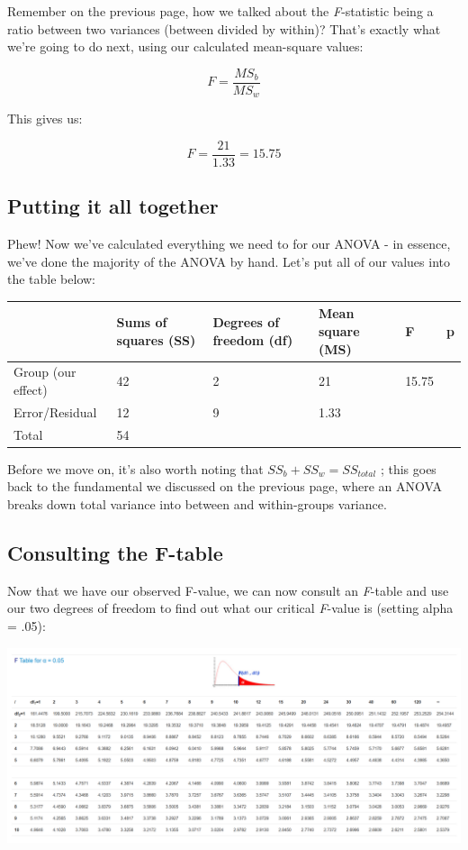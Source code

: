 \documentclass[
]{book}
\begin{document}
Remember on the previous page, how we talked about the \emph{F}-statistic being
a ratio between two variances (between divided by within)? That's
exactly what we're going to do next, using our calculated mean-square
values:

\[
F = \frac{MS_b}{MS_w}
\]

This gives us:

\[
F = \frac{21}{1.33} = 15.75
\]

\subsection{Putting it all together}\label{putting-it-all-together}

Phew! Now we've calculated everything we need to for our ANOVA - in
essence, we've done the majority of the ANOVA by hand. Let's put all of
our values into the table below:

\begin{tabular}{l|l|l|l|l|l}
\hline
 & Sums of squares (SS) & Degrees of freedom (df) & Mean square (MS) & F & p\\
\hline
Group (our effect) & 42 & 2 & 21 & 15.75 & \\
\hline
Error/Residual & 12 & 9 & 1.33 &  & \\
\hline
Total & 54 &  &  &  & \\
\hline
\end{tabular}

Before we move on, it's also worth noting that
\(SS_b + SS_w = SS_{total}\) ; this goes back to the fundamental we
discussed on the previous page, where an ANOVA breaks down total
variance into between and within-groups variance.

\subsection{Consulting the F-table}\label{consulting-the-f-table}

Now that we have our observed F-value, we can now consult an \emph{F}-table and
use our two degrees of freedom to find out what our critical \emph{F}-value is
(setting alpha = .05):

\includegraphics{img/w9_f-table.png}
\end{document}
